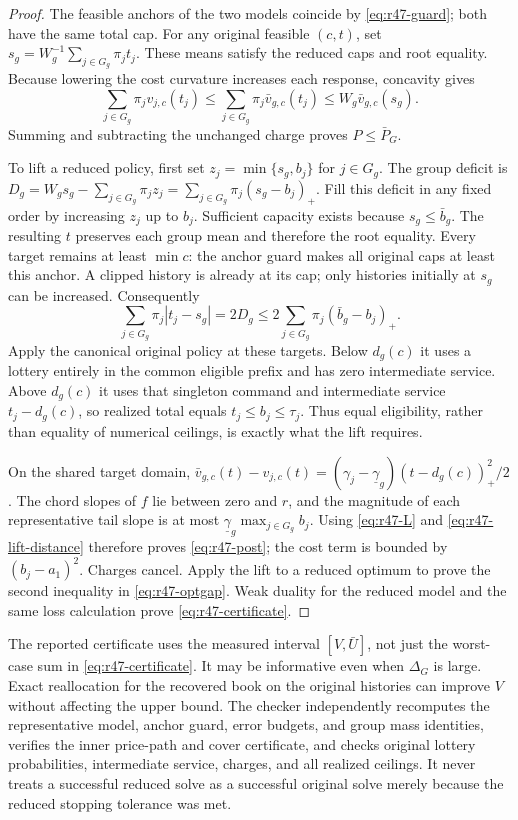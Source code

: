 \begin{proof}
The feasible anchors of the two models coincide by \eqref{eq:r47-guard}; both have the same total cap. For any original feasible $(c,t)$, set $s_g=W_g^{-1}\sum_{j\in G_g}\pi_jt_j$. These means satisfy the reduced caps and root equality. Because lowering the cost curvature increases each response, concavity gives
\[
 \sum_{j\in G_g}\pi_jv_{j,c}(t_j)
 \leq\sum_{j\in G_g}\pi_j\bar v_{g,c}(t_j)
 \leq W_g\bar v_{g,c}(s_g).
\]
Summing and subtracting the unchanged charge proves $P\leq\bar P_G$.

To lift a reduced policy, first set $z_j=\min\{s_g,b_j\}$ for $j\in G_g$. The group deficit is
$D_g=W_gs_g-\sum_{j\in G_g}\pi_jz_j=\sum_{j\in G_g}\pi_j(s_g-b_j)_+$.
Fill this deficit in any fixed order by increasing $z_j$ up to $b_j$. Sufficient capacity exists because $s_g\leq\bar b_g$. The resulting $t$ preserves each group mean and therefore the root equality. Every target remains at least $\min c$: the anchor guard makes all original caps at least this anchor. A clipped history is already at its cap; only histories initially at $s_g$ can be increased. Consequently
\begin{equation}\label{eq:r47-lift-distance}
 \sum_{j\in G_g}\pi_j|t_j-s_g|
   =2D_g\leq2\sum_{j\in G_g}\pi_j(\bar b_g-b_j)_+.
\end{equation}
Apply the canonical original policy at these targets. Below $d_g(c)$ it uses a lottery entirely in the common eligible prefix and has zero intermediate service. Above $d_g(c)$ it uses that singleton command and intermediate service $t_j-d_g(c)$, so realized total equals $t_j\leq b_j\leq\tau_j$. Thus equal eligibility, rather than equality of numerical ceilings, is exactly what the lift requires.

On the shared target domain,
$\bar v_{g,c}(t)-v_{j,c}(t)=(\gamma_j-\underline\gamma_g)(t-d_g(c))_+^2/2$.
The chord slopes of $f$ lie between zero and $r$, and the magnitude of each representative tail slope is at most $\underline\gamma_g\max_{j\in G_g}b_j$. Using \eqref{eq:r47-L} and \eqref{eq:r47-lift-distance} therefore proves \eqref{eq:r47-post}; the cost term is bounded by $(b_j-a_1)^2$. Charges cancel. Apply the lift to a reduced optimum to prove the second inequality in \eqref{eq:r47-optgap}. Weak duality for the reduced model and the same loss calculation prove \eqref{eq:r47-certificate}.
\end{proof}

The reported certificate uses the measured interval $[V,\bar U]$, not just the worst-case sum in \eqref{eq:r47-certificate}. It may be informative even when $\Delta_G$ is large. Exact reallocation for the recovered book on the original histories can improve $V$ without affecting the upper bound. The checker independently recomputes the representative model, anchor guard, error budgets, and group mass identities, verifies the inner price-path and cover certificate, and checks original lottery probabilities, intermediate service, charges, and all realized ceilings. It never treats a successful reduced solve as a successful original solve merely because the reduced stopping tolerance was met.

